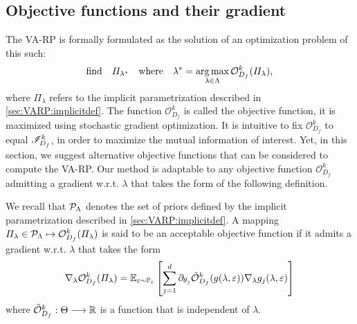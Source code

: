 


\subsection{Objective functions and their gradient}\label{sec:VARP:objectivefunctions}

The VA-RP is formally formulated as the solution of an optimization problem of this such:
\begin{equation}\label{eq:opti_pb_pilambda}
    \text{find}\quad \varPi_{\lambda^\ast} \quad\text{where}\quad \lambda^\ast=\operatorname*{arg\,max}_{\lambda\in\Lambda} \mathcal{O}_{D_f}^k(\varPi_{\lambda}),
\end{equation}
where $\varPi_\lambda$ refers to the implicit parametrization described in \cref{sec:VARP:implicitdef}. The function $\mathcal{O}^k_{D_f}$\vspace*{-2pt} is called the objective function, it is maximized using  stochastic gradient optimization. It is intuitive to fix $\mathcal{O}^k_{D_f}$\vspace*{-2pt} to equal $\mathscr{I}^k_{D_f}$, in order to maximize the mutual information of interest.
Yet, in this section, we suggest alternative objective functions that can be considered to compute the VA-RP.
Our method is adaptable to any objective function $\mathcal{O}^k_{D_f}$  admitting a gradient w.r.t. $\lambda$ that takes the form of the following definition. %
\begin{defi}\label{def:VARP:acceptable}
    We recall that $\mathcal{P}_\Lambda$ denotes the set of priors defined by the implicit parametrization described in \cref{sec:VARP:implicitdef}.
    A mapping $\varPi_\lambda\in\mathcal{P}_{\Lambda}\mapsto\mathcal{O}_{D_f}^k(\varPi_\lambda)$ is said to be an acceptable objective function if it admits a gradient w.r.t. $\lambda$ that takes the form
        \begin{equation}\label{eq:compatible_objective_function}
             \nabla_\lambda\mathcal{O}_{D_f}^k(\varPi_{\lambda}) = \mathbb{E}_{\varepsilon\sim\mathbb{P}_\varepsilon}\left[\sum_{j=1}^d\partial_{\theta_j} \Tilde{\mathcal{O}}^k_{D_f}(g(\lambda,\varepsilon))\nabla_\lambda g_j(\lambda,\varepsilon)\right]
        \end{equation}
        where  $\tilde{\mathcal O}^k_{D_f}:\Theta\longrightarrow\mathbb{R}$ is a function that is independent of $\lambda$.
\end{defi}


